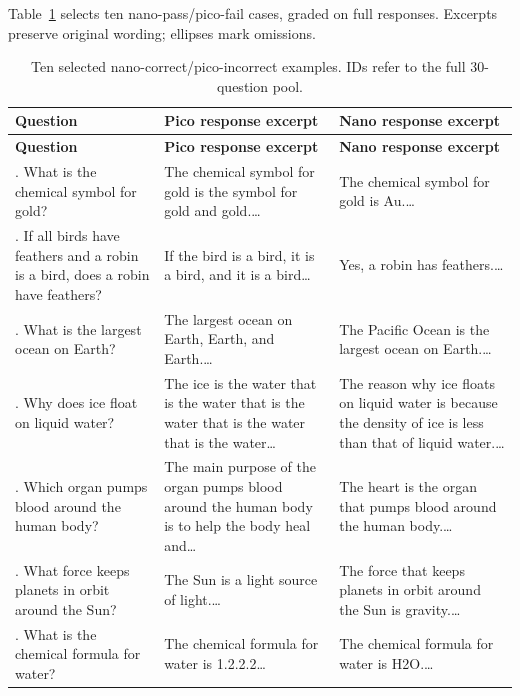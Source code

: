 \documentclass[11pt]{article}
\begin{document}
Table~\ref{tab:p5-questions} selects ten nano-pass/pico-fail cases, graded on
full responses. Excerpts preserve original wording; ellipses mark omissions.

\begingroup
\small
\setlength{\tabcolsep}{4pt}
\renewcommand{\arraystretch}{1.16}
\begin{longtable}{|>{\raggedright\arraybackslash}p{}|>{\raggedright\arraybackslash}p{}|>{\raggedright\arraybackslash}p{}|}
\caption{Ten selected nano-correct/pico-incorrect examples. IDs refer to the full 30-question pool.}\label{tab:p5-questions}\\
\hline
\textbf{Question} & \textbf{Pico response excerpt} & \textbf{Nano response excerpt} \\
\hline
\endfirsthead
\hline \textbf{Question} & \textbf{Pico response excerpt} & \textbf{Nano response excerpt} \\\hline
\endhead
\hline
\endfoot
2. What is the chemical symbol for gold? & The chemical symbol for gold is the symbol for gold and gold.\ldots & The chemical symbol for gold is Au.\ldots \\ \hline
18. If all birds have feathers and a robin is a bird, does a robin have feathers? & If the bird is a bird, it is a bird, and it is a bird\ldots & Yes, a robin has feathers.\ldots \\ \hline
10. What is the largest ocean on Earth? & The largest ocean on Earth, Earth, and Earth.\ldots & The Pacific Ocean is the largest ocean on Earth.\ldots \\ \hline
11. Why does ice float on liquid water? & The ice is the water that is the water that is the water that is the water that is the water\ldots & The reason why ice floats on liquid water is because the density of ice is less than that of liquid water.\ldots \\ \hline
14. Which organ pumps blood around the human body? & The main purpose of the organ pumps blood around the human body is to help the body heal and\ldots & The heart is the organ that pumps blood around the human body.\ldots \\ \hline
19. What force keeps planets in orbit around the Sun? & The Sun is a light source of light.\ldots & The force that keeps planets in orbit around the Sun is gravity.\ldots \\ \hline
21. What is the chemical formula for water? & The chemical formula for water is 1.2.2.2\ldots & The chemical formula for water is H2O.\ldots \\ \hline

\end{longtable}
\end{document}
